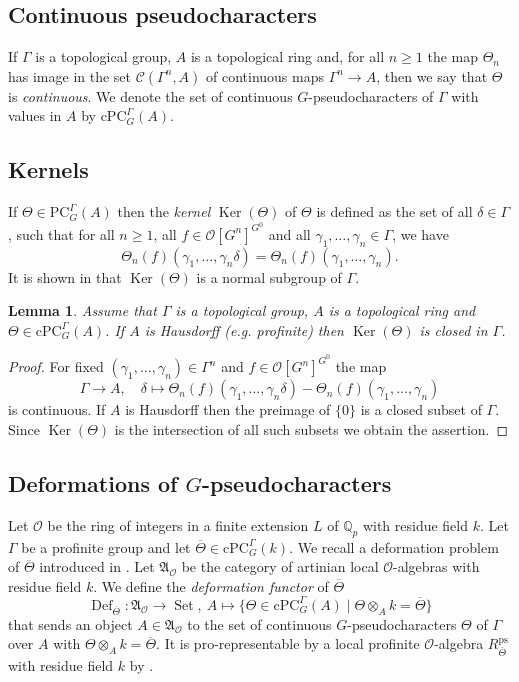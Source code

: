 \documentclass{amsart}
\newtheorem{lem}[prop]{Lemma}
\theoremstyle{definition}
\theoremstyle{remark}
\DeclareMathOperator{\Ker}{Ker}
\DeclareMathOperator{\Def}{Def}
\DeclareMathOperator{\Set}{Set}
\newcommand{\Qp}{\mathbb {Q}_p}
\newcommand{\Aa}{\mathfrak A}
\newcommand{\OO}{\mathcal O}
\newcommand{\PC}{\mathrm{PC}}
\newcommand{\cPC}{\mathrm{cPC}}
\newcommand{\Thetabar}{\overline{\Theta}}
\newcommand{\Cont}{\mathcal C}
\newcommand{\ps}{\mathrm{ps}}
\begin{document}
\subsection{Continuous pseudocharacters}
If $\Gamma$ is a topological group, $A$ is a topological ring and, for all $n \geq 1$ the map $\Theta_n$ has image in the set $\Cont(\Gamma^n, A)$ of continuous maps $\Gamma^n \to A$, then we say that $\Theta$ is \emph{continuous}. We denote the set of continuous $G$-pseudocharacters of $\Gamma$ with values in $A$ by $\cPC_G^{\Gamma}(A)$.
\subsection{Kernels}\label{sec_ker}  If $\Theta\in \PC^{\Gamma}_G(A)$ then 
the \textit{kernel} $\Ker(\Theta)$ of $\Theta$ is defined
as the set of all $\delta\in \Gamma$, such that for all $n\ge 1$, all $f\in \OO[G^n]^{G^0}$  and all $\gamma_1, \ldots, \gamma_n\in \Gamma$, we have
\begin{equation}
\Theta_n(f)(\gamma_1, \ldots, \gamma_n \delta)= 
\Theta_n(f)(\gamma_1, \ldots, \gamma_n).
\end{equation}
It is shown in \cite[Lemma 3.11]{quast} that $\Ker(\Theta)$ is a normal subgroup of $\Gamma$. 
\begin{lem}\label{ker_closed}Assume that $\Gamma$ is a topological group, $A$ is a topological ring and $\Theta\in \cPC^{\Gamma}_G(A)$. 
If $A$ is Hausdorff (e.g. profinite) then $\Ker(\Theta)$ is closed in $\Gamma$. 
\end{lem} 
\begin{proof} For  fixed $(\gamma_1, \ldots, \gamma_n)\in \Gamma^n$ and $f\in \OO[G^n]^{G^0}$ the map 
\begin{equation}
\Gamma \rightarrow A, \quad \delta\mapsto \Theta_n(f)(\gamma_1, \ldots, \gamma_n \delta)-
\Theta_n(f)(\gamma_1, \ldots, \gamma_n)
\end{equation}
is continuous. If $A$ is Hausdorff then the 
preimage of $\{0\}$ is a closed subset of $\Gamma$. 
Since $\Ker(\Theta)$ is the intersection of all such subsets 
we obtain the assertion.
\end{proof} 

\subsection{Deformations of $G$-pseudocharacters}\label{sec_pseudo_def} Let $\OO$ be
the ring of integers in a finite extension $L$ of $\Qp$ with residue field $k$.
Let $\Gamma$ be a profinite group and let   $\Thetabar \in \cPC^{\Gamma}_G(k)$.
We recall a deformation problem of $\Thetabar$ introduced in  \cite[Section 5]{quast}.  Let $\Aa_{\OO}$ be the category of artinian local $\OO$-algebras with residue field $k$.
We define the \emph{deformation functor} of $\Thetabar$
$$ \Def_{\Thetabar} : \Aa_{\OO} \to \Set, ~A \mapsto \{\Theta \in \cPC_G^{\Gamma}(A) \mid \Theta \otimes_A k = \Thetabar\} $$
that sends an object $A \in \Aa_{\OO}$ to the set of continuous $G$-pseudocharacters $\Theta$ of $\Gamma$ over $A$ with $\Theta \otimes_A k = \Thetabar$.
It is pro-representable by a  local profinite $\OO$-algebra $R^{\ps}_{\Thetabar}$ with residue field $k$ by
\cite[Theorem 5.4]{quast}.
\end{document}
